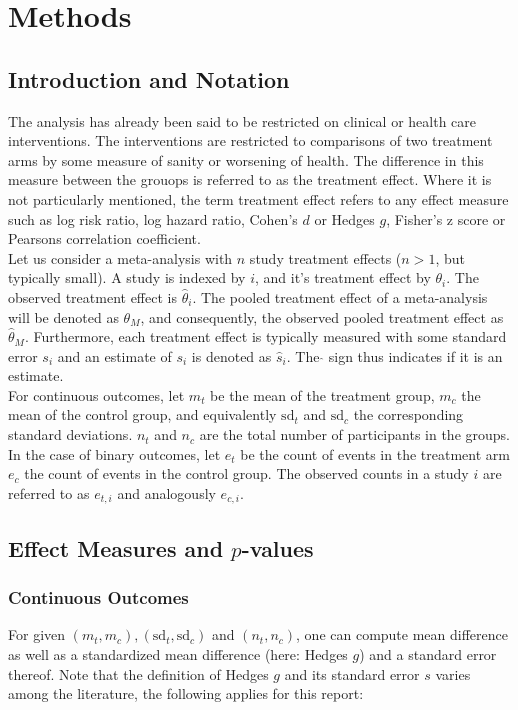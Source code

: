 \documentclass[11pt,a4paper,twoside]{book}\usepackage[]{graphicx}\usepackage[]{color}
\begin{document}




\chapter{Methods}
\section{Introduction and Notation}
The analysis has already been said to be restricted on clinical or health care interventions. The interventions are restricted to comparisons of two treatment arms by some measure of sanity or worsening of health. The difference in this measure between the grouops is referred to as the treatment effect. Where it is not particularly mentioned, the term treatment effect refers to any effect measure such as log risk ratio, log hazard ratio, Cohen's $d$ or Hedges $g$, Fisher's z score or Pearsons correlation coefficient. \\
Let us consider a meta-analysis with $n$ study treatment effects ($n > 1$, but typically small). A study is indexed by $i$, and it's treatment effect by  $\theta_i$. The observed treatment effect is $\hat{\theta}_i$. The pooled treatment effect of a meta-analysis will be denoted as $\theta_M$, and consequently, the observed pooled treatment effect as $\hat{\theta}_M$. Furthermore, each treatment effect is typically measured with some standard error $s_i$ and an estimate of $s_i$ is denoted as $\hat{s}_i$. The $\hat{}$ sign thus indicates if it is an estimate.\\
For continuous outcomes, let $m_t$ be the mean of the treatment group, $m_c$ the mean of the control group, and equivalently $\textrm{sd}_t$ and $\textrm{sd}_c$ the corresponding standard deviations. $n_t$ and $n_c$ are the total number of participants in the groups.
In the case of binary outcomes, let $e_t$ be the count of events in the treatment arm $e_c$ the count of events in the control group. The observed counts in a study $i$ are referred to as $e_{t,i}$ and analogously $e_{c,i}$.

\section{Effect Measures and $p$-values}
\subsection{Continuous Outcomes}
For given $(m_t, m_c), (\textrm{sd}_t, \textrm{sd}_c)$ and $(n_t, n_c)$, one can compute mean difference as well as a standardized mean difference (here: Hedges $g$) and  a standard error thereof. Note that the definition of Hedges $g$ and its standard error $s$ varies among the literature, the following applies for this report:
\end{document}
